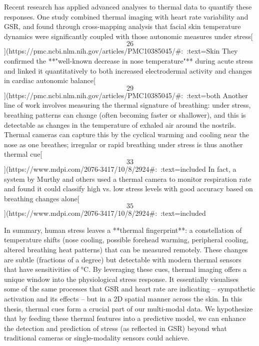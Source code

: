 \documentclass[12pt,a4paper]{article}
\begin{document}
Recent research has applied advanced analyses to thermal data to
quantify these responses. One study combined thermal imaging with heart
rate variability and GSR, and found through cross-mapping analysis that
facial skin temperature dynamics were significantly coupled with those
autonomic measures under
stress[\[26\]](https://pmc.ncbi.nlm.nih.gov/articles/PMC10385045/#:~:text=Skin%
They confirmed the **"well-known decrease in nose temperature"** during
acute stress and linked it quantitatively to both increased
electrodermal activity and changes in cardiac autonomic
balance[\[29\]](https://pmc.ncbi.nlm.nih.gov/articles/PMC10385045/#:~:text=both%
Another line of work involves measuring the thermal signature of
breathing: under stress, breathing patterns can change (often becoming
faster or shallower), and this is detectable as changes in the
temperature of exhaled air around the nostrils. Thermal cameras can
capture this by the cyclical warming and cooling near the nose as one
breathes; irregular or rapid breathing under stress is thus another
thermal
cue[\[33\]](https://www.mdpi.com/2076-3417/10/8/2924#:~:text=included%
In fact, a system by Murthy and others used a thermal camera to monitor
respiration rate and found it could classify high vs. low stress levels
with good accuracy based on breathing changes
alone[\[35\]](https://www.mdpi.com/2076-3417/10/8/2924#:~:text=included%

In summary, human stress leaves a **thermal fingerprint**: a
constellation of temperature shifts (nose cooling, possible forehead
warming, peripheral cooling, altered breathing heat patterns) that can
be measured remotely. These changes are subtle (fractions of a degree)
but detectable with modern thermal sensors that have sensitivities of
°C. By leveraging these cues, thermal imaging offers a unique
window into the physiological stress response. It essentially visualises
some of the same processes that GSR and heart rate are indicating --
sympathetic activation and its effects -- but in a 2D spatial manner
across the skin. In this thesis, thermal cues form a crucial part of our
multi-modal data. We hypothesize that by feeding these thermal features
into a predictive model, we can enhance the detection and prediction of
stress (as reflected in GSR) beyond what traditional cameras or
single-modality sensors could achieve.
\end{document}
